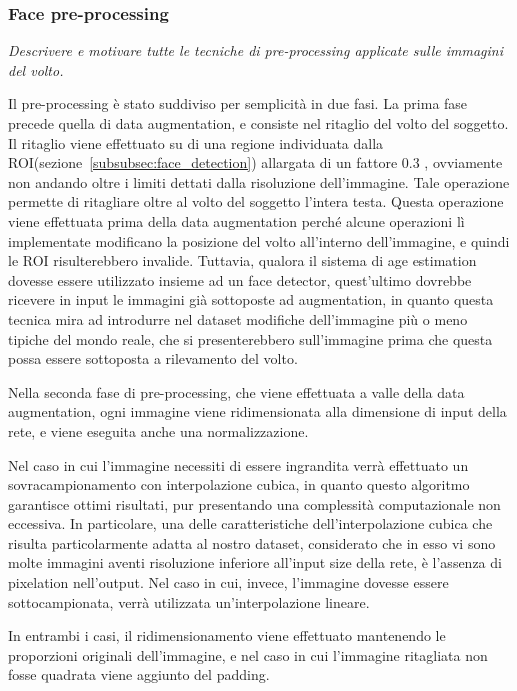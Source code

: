 \subsubsection{Face pre-processing} 

\emph{Descrivere e motivare tutte le tecniche di pre-processing applicate sulle immagini del volto.}

Il pre-processing è stato suddiviso per semplicità in due fasi. La prima fase precede quella di data augmentation, e consiste nel ritaglio del volto del soggetto. Il ritaglio viene effettuato su di una regione individuata dalla ROI(sezione~\ref{subsubsec:face_detection}) allargata di un fattore $0.3$ , ovviamente non andando oltre i limiti dettati dalla risoluzione dell'immagine. Tale operazione permette di ritagliare oltre al volto del soggetto l'intera testa. Questa operazione viene effettuata prima della data augmentation perché alcune operazioni lì implementate modificano la posizione del volto all'interno dell'immagine, e quindi le ROI risulterebbero invalide. Tuttavia, qualora il sistema di age estimation dovesse essere utilizzato insieme ad un face detector, quest'ultimo dovrebbe ricevere in input le immagini già sottoposte ad augmentation, in quanto questa tecnica mira ad introdurre nel dataset modifiche dell'immagine più o meno tipiche del mondo reale, che si presenterebbero sull'immagine prima che questa possa essere sottoposta a rilevamento del volto.

Nella seconda fase di pre-processing, che viene effettuata a valle della data augmentation, ogni immagine viene ridimensionata alla dimensione di input della rete, e viene eseguita anche una normalizzazione. 

Nel caso in cui l'immagine necessiti di essere ingrandita verrà effettuato un sovracampionamento con interpolazione cubica, in quanto questo algoritmo garantisce ottimi risultati, pur presentando una complessità computazionale non eccessiva. In particolare, una delle caratteristiche dell'interpolazione cubica che risulta particolarmente adatta al nostro dataset, considerato che in esso vi sono molte immagini aventi risoluzione inferiore all'input size della rete, è l'assenza di pixelation nell'output.
Nel caso in cui, invece, l'immagine dovesse essere sottocampionata, verrà utilizzata un'interpolazione lineare. 

In entrambi i casi, il ridimensionamento viene effettuato mantenendo le proporzioni originali dell'immagine, e nel caso in cui l'immagine ritagliata non fosse quadrata viene aggiunto del padding. 


